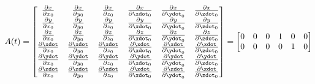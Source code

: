 \begin{equation}
    A(t)=\begin{bmatrix}    \frac{\partial x}{\partial x_{0}}       &   \frac{\partial x}{\partial y_{0}}       &   \frac{\partial x}{\partial z_{0}}       &   \frac{\partial x}{\partial \xdot_{0}}       &   \frac{\partial x}{\partial \ydot_{0}}       &   \frac{\partial x}{\partial \zdot_{0}}       \\
                            \frac{\partial y}{\partial x_{0}}       &   \frac{\partial y}{\partial y_{0}}       &   \frac{\partial y}{\partial z_{0}}       &   \frac{\partial y}{\partial \xdot_{0}}       &   \frac{\partial y}{\partial \ydot_{0}}       &   \frac{\partial y}{\partial \zdot_{0}}       \\
                            \frac{\partial z}{\partial x_{0}}       &   \frac{\partial z}{\partial y_{0}}       &   \frac{\partial z}{\partial z_{0}}       &   \frac{\partial z}{\partial \xdot_{0}}       &   \frac{\partial z}{\partial \ydot_{0}}       &   \frac{\partial z}{\partial \zdot_{0}}       \\
                            \frac{\partial \xdot}{\partial x_{0}}   &   \frac{\partial \xdot}{\partial y_{0}}   &   \frac{\partial \xdot}{\partial z_{0}}   &   \frac{\partial \xdot}{\partial \xdot_{0}}   &   \frac{\partial \xdot}{\partial \ydot_{0}}   &   \frac{\partial \xdot}{\partial \zdot_{0}}   \\
                            \frac{\partial \ydot}{\partial x_{0}}   &   \frac{\partial \ydot}{\partial y_{0}}   &   \frac{\partial \ydot}{\partial z_{0}}   &   \frac{\partial \ydot}{\partial \xdot_{0}}   &   \frac{\partial \ydot}{\partial \ydot_{0}}   &   \frac{\partial \ydot}{\partial \zdot_{0}}   \\
                            \frac{\partial \zdot}{\partial x_{0}}   &   \frac{\partial \zdot}{\partial y_{0}}   &   \frac{\partial \zdot}{\partial z_{0}}   &   \frac{\partial \zdot}{\partial \xdot_{0}}   &   \frac{\partial \zdot}{\partial \ydot_{0}}   &   \frac{\partial \zdot}{\partial \zdot_{0}}   \end{bmatrix}
        =\begin{bmatrix}    0                                       &   0                                       &   0                                       &   1   &   0   &   0   \\
                            0                                       &   0                                       &   0                                       &   0   &   1   &   0   \\

\end{bmatrix}
\end{equation}
